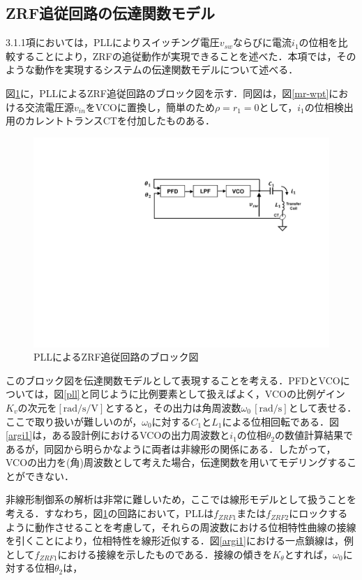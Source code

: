 \subsection{ZRF追従回路の伝達関数モデル}
3.1.1項においては，PLLによりスイッチング電圧$v_{sw}$ならびに電流$i_1$の位相を比較することにより，ZRFの追従動作が実現できることを述べた．本項では，そのような動作を実現するシステムの伝達関数モデルについて述べる．\par 
図\ref{pllblock}に，PLLによるZRF追従回路のブロック図を示す．同図は，図\ref{mr-wpt}における交流電圧源$v_{in}$をVCOに置換し，簡単のため$\rho=r_1=0$として，$i_1$の位相検出用のカレントトランスCTを付加したものある．

\begin{figure}[b]
\begin{center}

\includegraphics[width=120mm]{figures/pllblock.pdf}
\caption{PLLによるZRF追従回路のブロック図}
\label{pllblock}

\end{center}
\end{figure}

このブロック図を伝達関数モデルとして表現することを考える．PFDとVCOについては，図\ref{pll}と同じように比例要素として扱えばよく，VCOの比例ゲイン$K_v$の次元を$\mathrm{[rad/s/V]}$とすると，その出力は角周波数$\omega_0 \, \mathrm{[rad/s]}$として表せる．ここで取り扱いが難しいのが，$\omega_0$に対する$C_1$と$L_1$による位相回転である．図\ref{argi1}は，ある設計例におけるVCOの出力周波数と$i_1$の位相$\theta_2$の数値計算結果であるが，同図から明らかなように両者は非線形の関係にある．したがって，VCOの出力を(角)周波数として考えた場合，伝達関数を用いてモデリングすることができない．\par
非線形制御系の解析は非常に難しいため，ここでは線形モデルとして扱うことを考える．すなわち，図\ref{pllblock}の回路において，PLLは$f_{ZRF1}$または$f_{ZRF2}$にロックするように動作させることを考慮して，それらの周波数における位相特性曲線の接線を引くことにより，位相特性を線形近似する．図\ref{argi1}における一点鎖線は，例として$f_{ZRF1}$における接線を示したものである．接線の傾きを$K_\theta$とすれば，$\omega_0$に対する位相$\theta_2$は，

